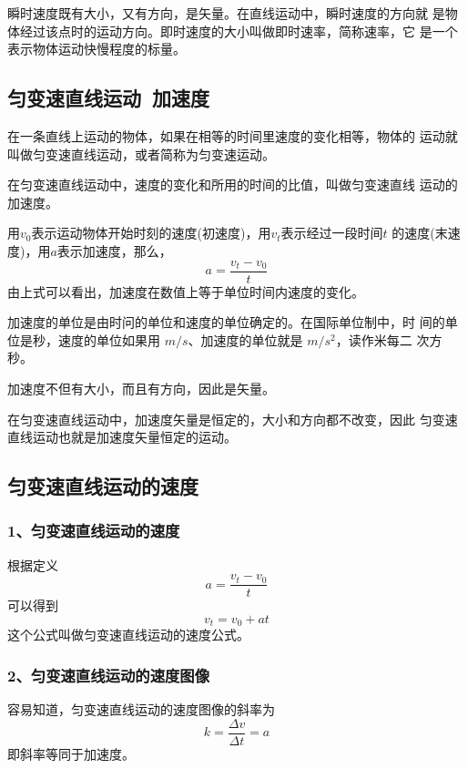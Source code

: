 瞬时速度既有大小，又有方向，是矢量。在直线运动中，瞬时速度的方向就
是物体经过该点时的运动方向。即时速度的大小叫做即时速率，简称速率，它
是一个表示物体运动快慢程度的标量。
\subsection{匀变速直线运动~加速度}
\begin{definition}
    在一条直线上运动的物体，如果在相等的时间里速度的变化相等，物体的
    运动就叫做匀变速直线运动，或者简称为匀变速运动。
\end{definition}

\begin{definition}
    在匀变速直线运动中，速度的变化和所用的时间的比值，叫做匀变速直线
    运动的加速度。
\end{definition}

用$v_0$表示运动物体开始时刻的速度(初速度)，用$v_t$表示经过一段时间$t$
的速度(末速度)，用$a$表示加速度，那么，
\begin{equation}
    a=\frac{v_t-v_0}{t}
\end{equation}
由上式可以看出，加速度在数值上等于单位时间内速度的变化。

加速度的单位是由时问的单位和速度的单位确定的。在国际单位制中，时
间的单位是秒，速度的单位如果用 $m/s$、加速度的单位就是 $m/s^2$，读作米每二
次方秒。

加速度不但有大小，而且有方向，因此是矢量。

在匀变速直线运动中，加速度矢量是恒定的，大小和方向都不改变，因此
匀变速直线运动也就是加速度矢量恒定的运动。
\subsection{匀变速直线运动的速度}
\subsubsection*{1、匀变速直线运动的速度}
根据定义
\begin{equation}
    a=\frac{v_t-v_0}{t}
\end{equation}
可以得到
\begin{equation}
    v_t=v_0+at
\end{equation}
这个公式叫做匀变速直线运动的速度公式。
\subsubsection*{2、匀变速直线运动的速度图像}
容易知道，匀变速直线运动的速度图像的斜率为 
\begin{equation}
    k=\frac{\Delta v}{\Delta t}=a
\end{equation}
即斜率等同于加速度。

